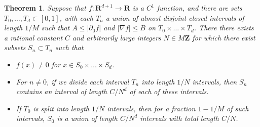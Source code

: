 \documentclass{report}
\theoremstyle{plain}
\theoremstyle{plain}
\newtheorem{theorem}{Theorem}
\begin{document}
\begin{theorem}
    Suppose that $f: \mathbf{R}^{d+1} \to \mathbf{R}$ is a $C^1$ function, and there are sets $T_0, \dots, T_d \subset [0,1]$, with each $T_n$ a union of almost disjoint closed intervals of length $1/M$ such that $A \leq |\partial_0 f|$ and $|\nabla f| \leq B$ on $T_0 \times \dots \times T_d$. There there exists a rational constant $C$ and arbitrarily large integers $N \in M \mathbf{Z}$ for which there exist subsets $S_n \subset T_n$ such that
    \begin{itemize}
        \item[(i)] $f(x) \neq 0$ for $x \in S_0 \times \dots \times S_d$.

        \item[(ii)] For $n \neq 0$, if we divide each interval $T_n$ into length $1/N$ intervals, then $S_n$ contains an interval of length $C/N^d$ of each of these intervals.

        \item[(iii)] If $T_0$ is split into length $1/N$ intervals, then for a fraction $1 - 1/M$ of such intervals, $S_0$ is a union of length $C/N^d$ intervals with total length $C/N$.
    \end{itemize}
\end{theorem}
\end{document}
